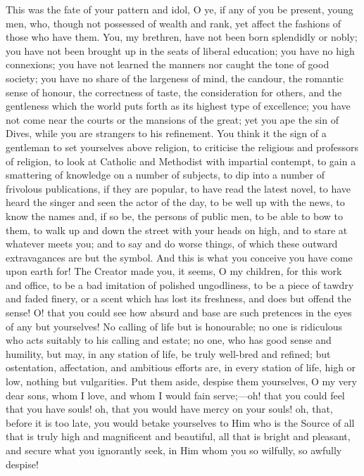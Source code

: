 This was the fate of your pattern and idol, O ye, if any of you be
present, young men, who, though not possessed of wealth and rank, yet
affect the fashions of those who have them. You, my brethren, have not
been born splendidly or nobly; you have not been brought up in the
seats of liberal education; you have no high connexions; you have not
learned the manners nor caught the tone of good society; you have no
share of the largeness of mind, the candour, the romantic sense of
honour, the correctness of taste, the consideration for others, and
the gentleness which the world puts forth as its highest type of
excellence; you have not come near the courts or the mansions of the
great; yet you ape the sin of Dives, while you are strangers to his
refinement. You think it the sign of a gentleman to set yourselves
above religion, to criticise the religious and professors of religion,
to look at Catholic and Methodist with impartial contempt, to gain a
smattering of knowledge on a number of subjects, to dip into a number
of frivolous publications, if they are popular, to have read the
latest novel, to have heard the singer and seen the actor of the day,
to be well up with the news, to know the names and, if so be, the
persons of public men, to be able to bow to them, to walk up and down
the street with your heads on high, and to stare at whatever meets
you; and to say and do worse things, of which these outward
extravagances are but the symbol. And this is what you conceive you
have come upon earth for! The Creator made you, it seems, O my
children, for this work and office, to be a bad imitation of polished
ungodliness, to be a piece of tawdry and faded finery, or a scent
which has lost its freshness, and does but offend the sense! O! that
you could see how absurd and base are such pretences in the eyes of
any but yourselves! No calling of life but is honourable; no one is
ridiculous who acts suitably to his calling and estate; no one, who
has good sense and humility, but may, in any station of life, be truly
well-bred and refined; but ostentation, affectation, and ambitious
efforts are, in every station of life, high or low, nothing but
vulgarities. Put them aside, despise them yourselves, O my very dear
sons, whom I love, and whom I would fain serve;—oh! that you could
feel that you have souls! oh, that you would have mercy on your
souls! oh, that, before it is too late, you would betake yourselves to
Him who is the Source of all that is truly high and magnificent and
beautiful, all that is bright and pleasant, and secure what you
ignorantly seek, in Him whom you so wilfully, so awfully despise!

